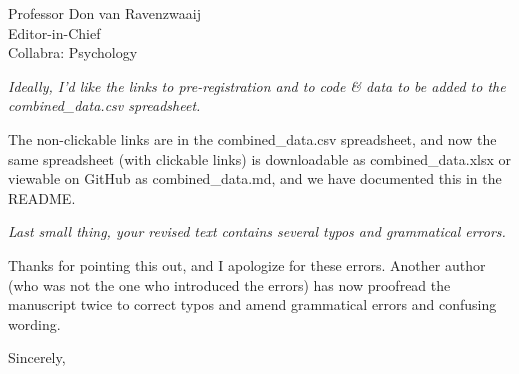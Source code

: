 \documentclass{stanfordletter}
\newcommand{\theysaid}[1]{\begin{leftbar} \noindent 
		\textsl{ #1}\end{leftbar}}
\begin{document}
\begin{letter}{Professor Don van Ravenzwaaij \\ Editor-in-Chief \\ Collabra: Psychology }
	\theysaid{Ideally, I’d like the links to pre-registration and to code \& data to be added to the combined\_data.csv spreadsheet.}
	
	The non-clickable links are in the combined\_data.csv spreadsheet, and now the same spreadsheet (with clickable links) is downloadable as combined\_data.xlsx or viewable on GitHub as combined\_data.md, and we have documented this in the README. 
	
	\theysaid{Last small thing, your revised text contains several typos and grammatical errors.}
	
	Thanks for pointing this out, and I apologize for these errors. Another author (who was not the one who introduced the errors) has now proofread the manuscript twice to correct typos and amend grammatical errors and confusing wording. 
	
			\closing{Sincerely,}
		
		\pagebreak

	

	
		\end{letter}
	
	
	
\end{document}
